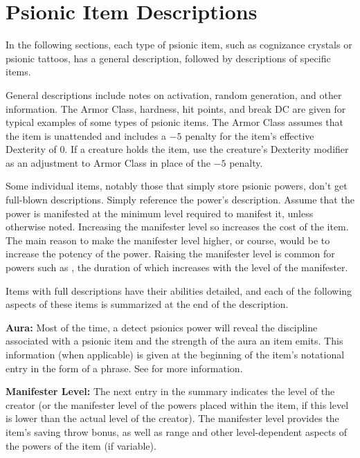 
\section{Psionic Item Descriptions}
In the following sections, each type of psionic item, such as cognizance crystals or psionic tattoos, has a general description, followed by descriptions of specific items.

General descriptions include notes on activation, random generation, and other information. The Armor Class, hardness, hit points, and break DC are given for typical examples of some types of psionic items. The Armor Class assumes that the item is unattended and includes a $-5$ penalty for the item's effective Dexterity of 0. If a creature holds the item, use the creature's Dexterity modifier as an adjustment to Armor Class in place of the $-5$ penalty.

Some individual items, notably those that simply store psionic powers, don't get full-blown descriptions. Simply reference the power's description. Assume that the power is manifested at the minimum level required to manifest it, unless otherwise noted. Increasing the manifester level so increases the cost of the item. The main reason to make the manifester level higher, or course, would be to increase the potency of the power. Raising the manifester level is common for powers such as , the duration of which increases with the level of the manifester.

Items with full descriptions have their abilities detailed, and each of the following aspects of these items is summarized at the end of the description.

\textbf{Aura:} Most of the time, a detect psionics power will reveal the discipline associated with a psionic item and the strength of the aura an item emits. This information (when applicable) is given at the beginning of the item's notational entry in the form of a phrase. See  for more information.%

\textbf{Manifester Level:} The next entry in the summary indicates the level of the creator (or the manifester level of the powers placed within the item, if this level is lower than the actual level of the creator). The manifester level provides the item's saving throw bonus, as well as range and other level-dependent aspects of the powers of the item (if variable).

